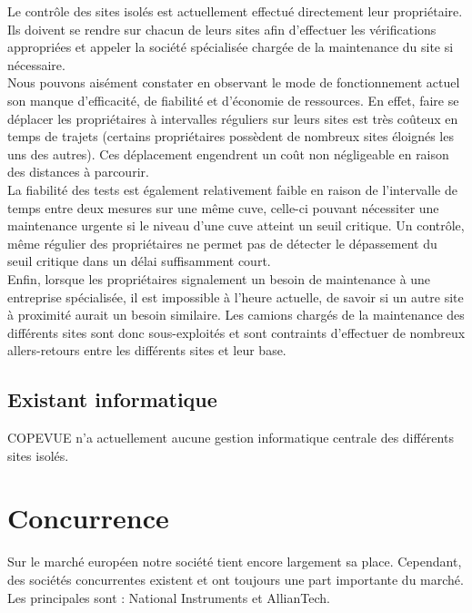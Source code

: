 Le contrôle des sites isolés est actuellement effectué directement leur propriétaire. Ils doivent se rendre sur chacun de leurs sites afin d'effectuer les vérifications appropriées et appeler la société spécialisée chargée de la maintenance du site si nécessaire.\\
Nous pouvons aisément constater en observant le mode de fonctionnement actuel son manque d'efficacité, de fiabilité et d'économie de ressources. En effet, faire se déplacer les propriétaires à intervalles réguliers sur leurs sites est très coûteux en temps de trajets (certains propriétaires possèdent de nombreux sites éloignés les uns des autres). Ces déplacement engendrent un coût non négligeable en raison des distances à parcourir. \\
La fiabilité des tests est également relativement faible en raison de l'intervalle de temps entre deux mesures sur une même cuve, celle-ci pouvant nécessiter une maintenance urgente si le niveau d'une cuve atteint un seuil critique. Un contrôle, même régulier des propriétaires ne permet pas de détecter le dépassement du seuil critique dans un délai suffisamment court.\\
Enfin, lorsque les propriétaires signalement un besoin de maintenance à une entreprise spécialisée, il est impossible à l'heure actuelle, de savoir si un autre site à proximité aurait un besoin similaire. Les camions chargés de la maintenance des différents sites sont donc sous-exploités et sont contraints d'effectuer de nombreux allers-retours entre les différents sites et leur base.

\subsection {Existant informatique}

COPEVUE n'a actuellement aucune gestion informatique centrale des différents sites isolés.

\section{Concurrence}

Sur le marché européen notre société tient encore largement sa place. Cependant, des sociétés concurrentes existent et ont toujours une part importante du marché. Les principales sont : National Instruments et AllianTech.

